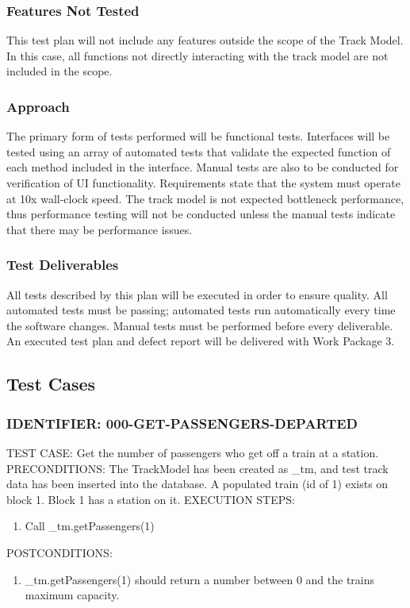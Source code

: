 \documentclass{scrreprt}
\begin{document}
\subsubsection{Features Not Tested}
This test plan will not include any features outside the scope of the Track Model. In this case, all functions not directly interacting with the track model are not included in the scope.

\subsubsection{Approach}
The primary form of tests performed will be functional tests. Interfaces will be tested using an array of automated tests that validate the expected function of each method included in the interface. Manual tests are also to be conducted for verification of UI functionality. Requirements state that the system must operate at 10x wall-clock speed. The track model is not expected bottleneck performance, thus performance testing will not be conducted unless the manual tests indicate that there may be performance issues.

\subsubsection{Test Deliverables}
All tests described by this plan will be executed in order to ensure quality. All automated tests must be passing; automated tests run automatically every time the software changes. Manual tests must be performed before every deliverable. An executed test plan and defect report will be delivered with Work Package 3.

\subsection{Test Cases}

\subsubsection{IDENTIFIER: 000-GET-PASSENGERS-DEPARTED}
TEST CASE: Get the number of passengers who get off a train at a station.
PRECONDITIONS: The TrackModel has been created as _tm, and test track data has been inserted into the database. A populated train (id of 1) exists on block 1. Block 1 has a station on it.
EXECUTION STEPS:
\begin{enumerate}
	\item Call _tm.getPassengers(1)
\end{enumerate}
POSTCONDITIONS:
\begin{enumerate}
	\item _tm.getPassengers(1) should return a number between 0 and the trains maximum capacity.
\end{enumerate}
\end{document}
